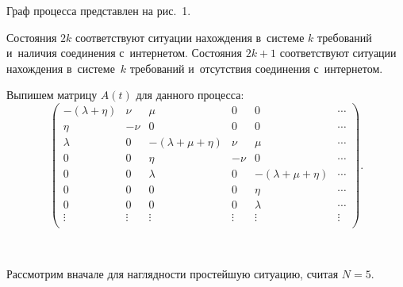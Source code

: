 \begin{multicols}{2}
Граф процесса представлен на рис.~1.



Состояния $2k$ соответствуют ситуации нахождения в~системе $k$
требований и~наличия соединения с~интернетом. Состояния $2k+1$
соответствуют ситуации нахождения в~системе~$k$ требований 
и~отсутствия соединения с~интернетом.

Выпишем матрицу $A(t)$ для данного процесса:
{%
\begin{equation*}
\begin{pmatrix}
-(\lambda+\eta) & \nu & \mu & 0 & 0 & \cdots \\
\eta & -\nu & 0 & 0 & 0 & \cdots \\
\lambda & 0 & -(\lambda+\mu+\eta) & \nu & \mu & \cdots \\
0 & 0 & \eta & -\nu & 0 & \cdots \\
0 & 0 & \lambda & 0 & -(\lambda+\mu+\eta) & \cdots \\
0 & 0 & 0 & 0 & \eta & \cdots \\
0 & 0 & 0 & 0 & \lambda & \cdots \\
\vdots & \vdots & \vdots & \vdots & \vdots & \vdots\\
\end{pmatrix}.
\end{equation*}
}


\begin{figure*} %
\vspace*{1pt}
 \begin{center}
 \mbox{%
 \epsfxsize=154.459mm 
 }
 \end{center}
\vspace*{-9pt}
\begin{minipage}[t]{80mm}
\end{minipage}
\hfill
\vspace*{-9pt}
\begin{minipage}[t]{80mm}
\end{minipage}
\vspace*{12pt}
\end{figure*}

\bigskip

Рассмотрим вначале для наглядности простейшую ситуацию, считая $N=5$.


\end{multicols}
